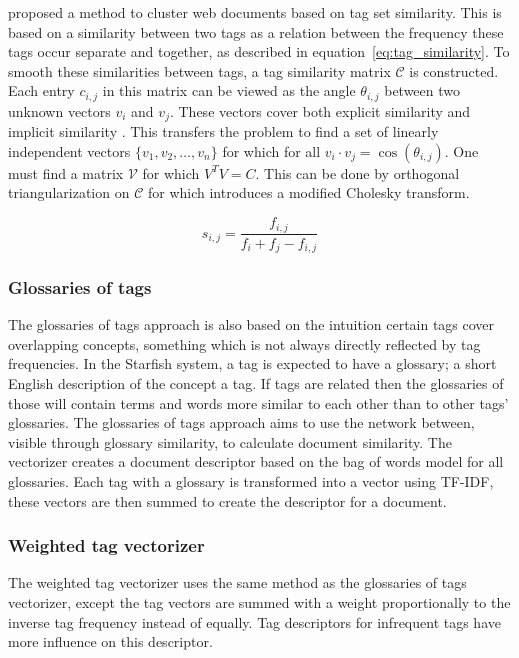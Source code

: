 \citet{zhou2011web} proposed a method to cluster web documents based on tag set similarity. This is based on a similarity between two tags as a relation between the frequency these tags occur separate and together, as described in equation~\ref{eq:tag_similarity}. To smooth these similarities between tags, a tag similarity matrix $\mathcal{C}$ is constructed. Each entry $c_{i,j}$ in this matrix can be viewed as the angle $\theta_{i,j}$ between two unknown vectors $v_i$ and $v_j$. These vectors cover both explicit similarity and implicit similarity \citep{park2010vector}. This transfers the problem to find a set of linearly independent vectors $\{v_1,v_2,\ldots,v_n\}$ for which for all $v_i \cdot v_j = \cos(\theta_{i,j})$. One must find a matrix $\mathcal{V}$ for which $V^TV = C$. This can be done by orthogonal triangularization on $\mathcal{C}$ for which \citeauthor{zhou2011web} introduces a modified Cholesky transform.

\begin{equation} \label{eq:tag_similarity}
s_{i,j} = \frac{f_{i,j}}{f_i + f_j - f_{i,j}}
\end{equation}


\subsubsection{Glossaries of tags}
The glossaries of tags approach is also based on the intuition certain tags cover overlapping concepts, something which is not always directly reflected by tag frequencies. In the Starfish system, a tag is expected to have a glossary; a short English description of the concept a tag. If tags are related then the glossaries of those will contain terms and words more similar to each other than to other tags' glossaries. The glossaries of tags approach aims to use the network between, visible through glossary similarity, to calculate document similarity.
The vectorizer creates a document descriptor based on the bag of words model for all glossaries. Each tag with a glossary is transformed into a vector using TF-IDF, these vectors are then summed to create the descriptor for a document.

\subsubsection{Weighted tag vectorizer}
The weighted tag vectorizer uses the same method as the glossaries of tags vectorizer, except the tag vectors are summed with a weight proportionally to the inverse tag frequency instead of equally. Tag descriptors for infrequent tags have more influence on this descriptor.

